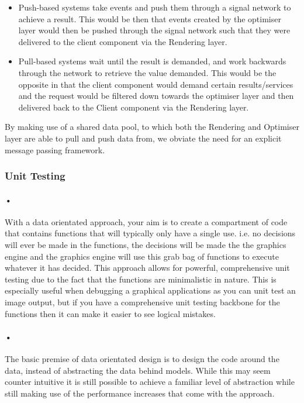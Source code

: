 \documentclass[11pt]{article}
\begin{document}
\begin{itemize}
\item Push-based systems take events and push them through a signal network to achieve a result. This would be then that events created by the optimiser layer would then be pushed through the signal network such that they were delivered to the client component via the Rendering layer.

\item Pull-based systems wait until the result is demanded, and work backwards through the network to retrieve the value demanded. This would be the opposite in that the client component would demand certain results/services and the request would be filtered down towards the optimiser layer and then delivered back to the Client component via the Rendering layer.
\end{itemize}

By making use of a shared data pool, to which both the Rendering and Optimiser layer are able to pull and push data from, we obviate the need for an explicit message passing framework.
\subsubsection{Unit Testing}
\paragraph{•}
With a data orientated approach, your aim is to create a compartment of code that contains functions that will typically only have a single use. i.e. no decisions will ever be made in the functions, the decisions will be made the the graphics engine and the graphics engine will use this grab bag of functions to execute whatever it has decided. This approach allows for powerful, comprehensive unit testing due to the fact that the functions are minimalistic in nature. This is especially useful when debugging a graphical applications as you can unit test an image output, but if you have a comprehensive unit testing backbone for the functions then it can make it easier to see logical mistakes.
\paragraph{•}
The basic premise of data orientated design is to design the code around the data, instead of abstracting the data behind models. While this may seem counter intuitive it is still possible to achieve a familiar level of abstraction while still making use of the performance increases that come with the approach.
\end{document}
